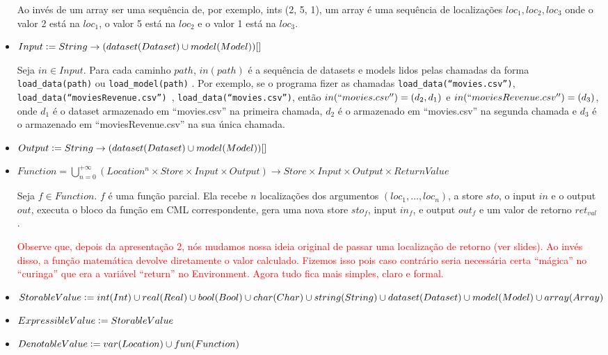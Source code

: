 \documentclass[12pt]{article}
\newcommand{\red}{\textcolor{red}}
\newcommand{\defeq}{\vcentcolon=}
\begin{document}
\begin{itemize}
Ao invés de um array ser uma sequência de, por exemplo, ints (2, 5, 1), um array é uma sequência de localizações $loc_1,loc_2,loc_3$ onde o valor 2 está na $loc_1$, o valor 5 está na $loc_2$ e o valor 1 está na $loc_3$.

\item $Input \defeq String\rightarrow (dataset(Dataset)\cup model(Model))[]$

Seja $in\in Input$. Para cada caminho $path$, $in(path)$ é  a sequência de datasets e models lidos pelas chamadas da forma {\tt load\_data(path)} ou {\tt load\_model(path)} . Por exemplo, se o programa fizer as chamadas {\tt load\_data(``movies.csv'')}, {\tt load\_data(``moviesRevenue.csv'') }, {\tt load\_data(``movies.csv'')}, então $in(``movies.csv'') = (d_2, d_1)$ e $in(``moviesRevenue.csv'') = (d_3)$, onde $d_1$ é o dataset armazenado em ``movies.csv'' na primeira chamada, $d_2$ é o armazenado em ``movies.csv'' na segunda chamada e $d_3$ é o armazenado em ``moviesRevenue.csv'' na sua única chamada.


\item $Output \defeq String\rightarrow (dataset(Dataset)\cup model(Model))[]$

\item $Function = \bigcup_{n = 0}^{+\infty} (Location^n \times Store \times Input \times Output) \rightarrow Store \times Input \times Output \times ReturnValue$

Seja $f\in Function$. $f$ é uma função parcial. Ela recebe $n$ localizações dos argumentos $(loc_1, \ldots, loc_n)$, a store $sto$, o input $in$ e o output $out$, executa o bloco da função em CML correspondente, gera uma nova store $sto_f$, input $in_f$, e output $out_f$ e um valor de retorno $ret_{val}$.

\red{Observe que, depois da apresentação 2, nós mudamos nossa ideia original de passar uma localização de retorno (ver slides). Ao invés disso, a função matemática devolve diretamente o valor calculado. Fizemos isso pois caso contrário seria necessária certa ``mágica'' no ``curinga'' que era a variável ``return'' no Environment. Agora tudo fica mais simples, claro e formal.}


\item $StorableValue \defeq int(Int) \cup real(Real) \cup bool(Bool) \cup char(Char) \cup string(String) \cup dataset(Dataset) \cup model(Model) \cup array(Array)$
\item $ExpressibleValue \defeq StorableValue$

\item $DenotableValue \defeq var(Location) \cup fun(Function)$


\end{itemize}
\end{document}
